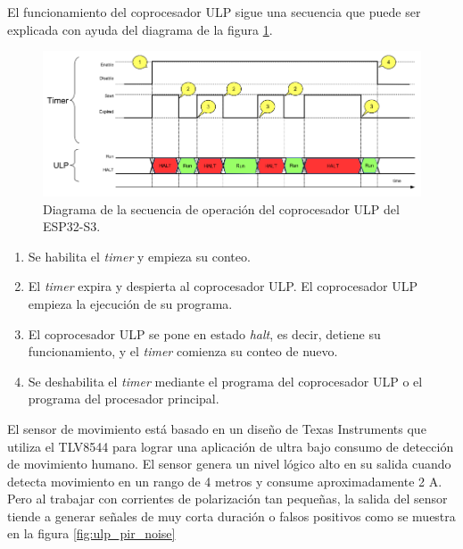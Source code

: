 El funcionamiento del coprocesador ULP sigue una secuencia que puede ser explicada con ayuda del diagrama de la figura \ref{fig:ulp_sequence}.

\begin{figure}[h]
	\centering
	\includegraphics[scale=0.43]{./Figures/ulp_sequence.png}
	\caption{Diagrama de la secuencia de operación del coprocesador ULP del ESP32-S3\protect\footnotemark.}
	\label{fig:ulp_sequence}
\end{figure}

\begin{enumerate}
	\item Se habilita el \textit{timer} y empieza su conteo.
	\item El \textit{timer} expira y despierta al coprocesador ULP. El coprocesador ULP empieza la ejecución de su programa. 
	\item El coprocesador ULP se pone en estado \textit{halt}, es decir, detiene su funcionamiento, y el \textit{timer} comienza su conteo de nuevo.
	\item Se deshabilita el \textit{timer} mediante el programa del coprocesador ULP o el programa del procesador principal.
\end{enumerate}

El sensor de movimiento está basado en un diseño de Texas Instruments \cite{pir_ti} que utiliza el TLV8544 para lograr una aplicación de ultra bajo consumo de detección de movimiento humano. El sensor genera un nivel lógico alto en su salida cuando detecta movimiento en un rango de 4 metros y consume aproximadamente 2 \textmu A. Pero al trabajar con corrientes de polarización tan pequeñas, la salida del sensor tiende a generar señales de muy corta duración o falsos positivos como se muestra en la figura \ref{fig:ulp_pir_noise}


